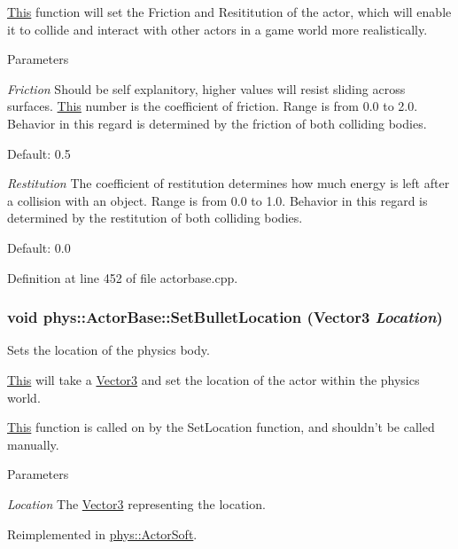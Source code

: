 \hyperlink{structThis}{This} function will set the Friction and Resititution of the actor, which will enable it to collide and interact with other actors in a game world more realistically. 
\begin{DoxyParams}{Parameters}
\item[{\em Friction}]Should be self explanitory, higher values will resist sliding across surfaces. \hyperlink{structThis}{This} number is the coefficient of friction. Range is from 0.0 to 2.0. Behavior in this regard is determined by the friction of both colliding bodies. \par
 Default: 0.5 \item[{\em Restitution}]The coefficient of restitution determines how much energy is left after a collision with an object. Range is from 0.0 to 1.0. Behavior in this regard is determined by the restitution of both colliding bodies. \par
 Default: 0.0 \end{DoxyParams}


Definition at line 452 of file actorbase.cpp.

\hypertarget{classphys_1_1ActorBase_aa7ab524d2905e640cea6324cce9ccfdb}{
\subsubsection[{SetBulletLocation}]{\setlength{\rightskip}{0pt plus 5cm}void phys::ActorBase::SetBulletLocation ({\bf Vector3} {\em Location})}}
\label{d8/d0f/classphys_1_1ActorBase_aa7ab524d2905e640cea6324cce9ccfdb}


Sets the location of the physics body. 

\hyperlink{structThis}{This} will take a \hyperlink{classphys_1_1Vector3}{Vector3} and set the location of the actor within the physics world. \par
 \hyperlink{structThis}{This} function is called on by the SetLocation function, and shouldn't be called manually. 
\begin{DoxyParams}{Parameters}
\item[{\em Location}]The \hyperlink{classphys_1_1Vector3}{Vector3} representing the location. \end{DoxyParams}


Reimplemented in \hyperlink{classphys_1_1ActorSoft_aef041f3eee69bb8eceef32fa0513e340}{phys::ActorSoft}.



